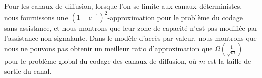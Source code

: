 \begin{otherlanguage}{french}
  Pour les canaux de diffusion, lorsque l'on se limite aux canaux déterministes, nous fournissons une $(1-e^{-1})^2$-approximation pour le problème du codage sans assistance, et nous montrons que leur zone de capacité n'est pas modifiée par l'assistance non-signalante. Dans le modèle d'accès par valeur, nous montrons que nous ne pouvons pas obtenir un meilleur ratio d'approximation que $\Omega\left(\frac{1}{\sqrt{m}}\right)$ pour le problème global du codage des canaux de diffusion, où $m$ est la taille de sortie du canal.
\end{otherlanguage}
